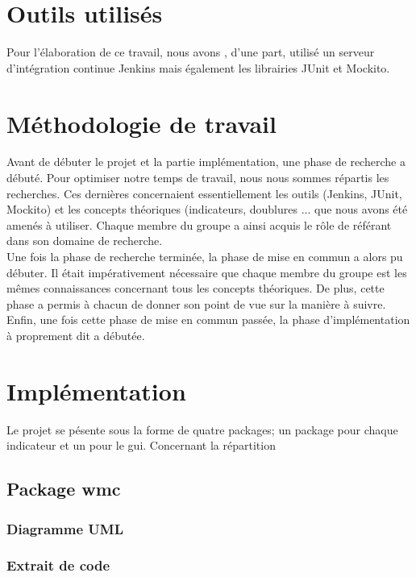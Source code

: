 \documentclass[11pt]{report}
\begin{document}
\chapter{Outils utilisés}
	Pour l'élaboration de ce travail, nous avons , d'une part, utilisé un serveur d'intégration continue Jenkins mais également les librairies JUnit et Mockito. 

\chapter{Méthodologie de travail}
Avant de débuter le projet et la partie implémentation, une phase de recherche a débuté. Pour optimiser notre temps de travail, nous nous sommes répartis les recherches. Ces dernières concernaient essentiellement les outils (Jenkins, JUnit, Mockito)  et les concepts théoriques (indicateurs, doublures ... que nous avons été amenés à utiliser. Chaque membre du groupe a ainsi acquis le rôle de référant dans son domaine de recherche.\\ 

Une fois la phase de recherche terminée, la phase de mise en commun a alors pu débuter. Il était impérativement nécessaire que chaque membre du groupe est les mêmes connaissances concernant tous les concepts théoriques. De plus, cette phase a permis à chacun de donner son point de vue sur la manière à suivre.\\ 

Enfin, une fois cette phase de mise en commun passée, la phase d'implémentation à proprement dit a débutée.\\ 


\chapter{Implémentation}

	Le projet se pésente sous la forme de quatre packages; un package pour chaque indicateur et un pour le gui. Concernant la répartition 
	
	\section{Package wmc}
		\subsection{Diagramme UML}
		\subsection{Extrait de code}
		
\end{document}
